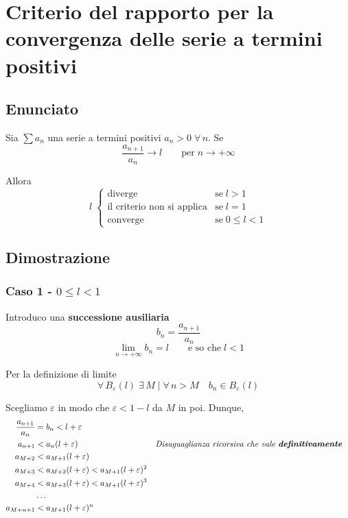 \documentclass[../../dimostrazioni]{subfiles}
\begin{document}
    \chapter{Criterio del rapporto per la convergenza delle serie a termini positivi}
    \label{criterioRapportoSerie}

        \section*{Enunciato}

            Sia \(\sum a_n\) una serie a termini positivi \(a_n > 0 \; \forall \, n\). Se
             \[\frac{a_{n+1}}{a_n} \longrightarrow l \qquad  \text{per} \; n \rightarrow +\infty \]
            
            Allora
            \[
                l \;
                \begin{cases}
                    \text{diverge} & \text{se} \; l > 1\\
                    \text{il criterio non si applica} & \text{se} \; l = 1\\
                    \text{converge} & \text{se} \; 0 \leqslant l < 1
                \end{cases}
            \]
            
        \section*{Dimostrazione}
            
            \subsection*{Caso 1 - \(0 \leqslant l < 1\)}

                Introduco una \textbf{successione ausiliaria}
                \[ b_n = \frac{a_{n+1}}{a_n} \]  
                \[\lim_{n \to +\infty} b_n = l \qquad \text{e so che} \; l < 1\]

                Per la definizione di limite
                \[\forall \, B_\varepsilon (l) \; \exists \, M \mid \forall \, n > M \quad b_n \in B_\varepsilon (l) \]

                Scegliamo \(\varepsilon\) in modo che \(\varepsilon < 1 - l\) da \(M\) in poi. Dunque,
                \begin{align*}
                    \frac{a_{n+1}}{a_n} &= b_n < l + \varepsilon \\
                    a_{n+1} &< a_n(l + \varepsilon) && \text{\emph{Disuguaglianza ricorsiva che vale \textbf{definitivamente}}} \\
                    a_{M+2} &< a_{M+1} (l + \varepsilon) \\
                    a_{M+3} &< a_{M+2} (l + \varepsilon) < a_{M+1}(l + \varepsilon)^{2}\\
                    a_{M+4} &< a_{M+3} (l + \varepsilon) < a_{M+1}(l + \varepsilon)^{3} \\
                    &\dots \\
                    a_{M+n+1} &< a_{M+1}(l + \varepsilon)^n
                \end{align*}
\end{document}
